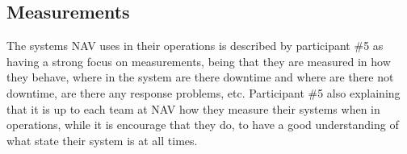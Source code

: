 




\subsection{Measurements}
The systems NAV uses in their operations is described by participant \#5 as having a strong focus on measurements, being that they are measured in how they behave, where in the system are there downtime and where are there not downtime, are there any response problems, etc. Participant \#5 also explaining that it is up to each team at NAV how they measure their systems when in operations, while it is encourage that they do, to have a good understanding of what state their system is at all times.

